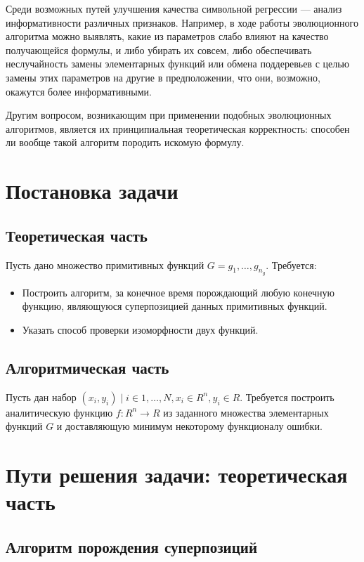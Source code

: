 \documentclass[12pt,a4paper]{amsart}
\begin{document}
Среди возможных путей улучшения качества символьной регрессии --- анализ
информативности различных признаков. Например, в ходе работы эволюционного
алгоритма можно выявлять, какие из параметров слабо влияют на качество
получающейся формулы, и либо убирать их совсем, либо обеспечивать
неслучайность замены элементарных функций или обмена поддеревьев с целью
замены этих параметров на другие в предположении, что они, возможно,
окажутся более информативными.

Другим вопросом, возникающим при применении подобных эволюционных алгоритмов,
является их принципиальная теоретическая корректность: способен ли вообще
такой алгоритм породить искомую формулу.

\section{Постановка задачи}

\subsection{Теоретическая часть}

Пусть дано множество примитивных функций $G = { g_1, \dots, g_{n_g} }$. Требуется:

\begin{itemize}
  \item Построить алгоритм, за конечное время порождающий любую конечную функцию,
	являющуюся суперпозицией данных примитивных функций.
  \item Указать способ проверки изоморфности двух функций.
\end{itemize}

\subsection{Алгоритмическая часть}

Пусть дан набор $(x_i, y_i) \mid i \in {1, \dots, N}, x_i \in R^n, y_i \in R$.
Требуется построить аналитическую функцию $f : R^n \rightarrow R$ из заданного
множества элементарных функций $G$ и доставляющую минимум некоторому функционалу
ошибки.

\section{Пути решения задачи: теоретическая часть}

\subsection{Алгоритм порождения суперпозиций}
\end{document}
